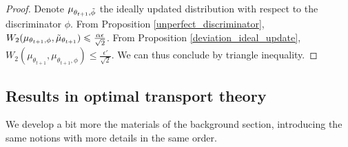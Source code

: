 \documentclass[runningheads]{llncs}
\newcommand{\id}{\mathcal{I}}
\begin{document}
\begin{proof}
Denote $\mu_{\theta_{t+1},\Tilde{\phi}}$ the ideally updated distribution with respect to the discriminator $\phi$. From Proposition \ref{unperfect_discriminator}, $W_2(\mu_{\theta_{t+1},\phi},\Tilde{\mu}_{\theta_{t+1}})\leqslant \frac{\alpha \epsilon }{\sqrt{2}}$. From Proposition \ref{deviation_ideal_update}, $W_2(\mu_{\theta_{t+1}},\mu_{\theta_{t+1},\phi})\leqslant \frac{\epsilon' }{\sqrt{2}}$. We can thus conclude by triangle inequality.




\end{proof}


\subsection{Results in optimal transport theory}
\label{OT_THEORY_BACKGROUND}
We develop a bit more the materials of the background section, introducing the same notions with more details in the same order. \\
\end{document}
